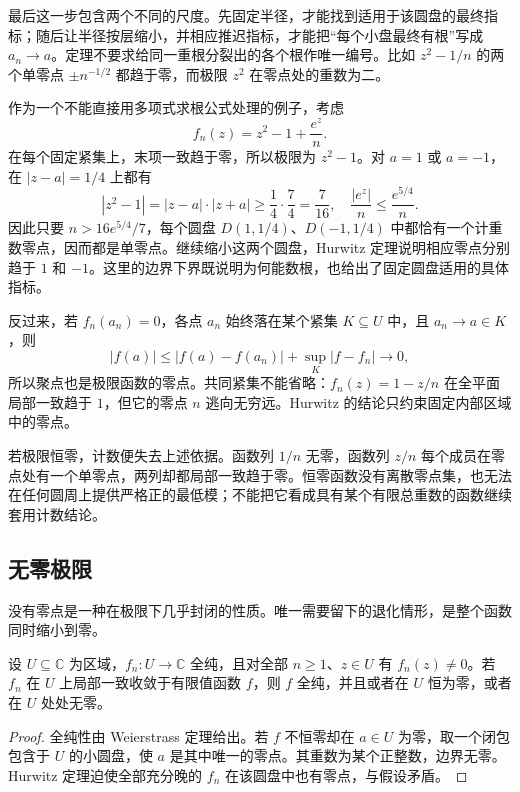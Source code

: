 最后这一步包含两个不同的尺度。先固定半径，才能找到适用于该圆盘的最终指标；随后让半径按层缩小，并相应推迟指标，才能把“每个小盘最终有根”写成 \(a_n\rightarrow a\)。定理不要求给同一重根分裂出的各个根作唯一编号。比如 \(z^2-1/n\) 的两个单零点 \(\pm n^{-1/2}\) 都趋于零，而极限 \(z^2\) 在零点处的重数为二。

\ProseParagraphBreak

作为一个不能直接用多项式求根公式处理的例子，考虑
\[
 f_n(z)=z^2-1+\frac{e^z}{n}.
\]
在每个固定紧集上，末项一致趋于零，所以极限为 \(z^2-1\)。对 \(a=1\) 或 \(a=-1\)，在 \(|z-a|=1/4\) 上都有
\[
 |z^2-1|=|z-a|\cdot|z+a|\ge\frac14\cdot\frac74=\frac7{16},
 \quad \frac{|e^z|}{n}\le\frac{e^{5/4}}n.
\]
因此只要 \(n>16e^{5/4}/7\)，每个圆盘 \(D(1,1/4)\)、\(D(-1,1/4)\) 中都恰有一个计重数零点，因而都是单零点。继续缩小这两个圆盘，Hurwitz 定理说明相应零点分别趋于 \(1\) 和 \(-1\)。这里的边界下界既说明为何能数根，也给出了固定圆盘适用的具体指标。

\ProseParagraphBreak

反过来，若 \(f_n(a_n)=0\)，各点 \(a_n\) 始终落在某个紧集 \(K\subseteq U\) 中，且 \(a_n\rightarrow a\in K\)，则
\[
 |f(a)|\le |f(a)-f(a_n)|+\sup_K|f-f_n|\longrightarrow0,
\]
所以聚点也是极限函数的零点。共同紧集不能省略：\(f_n(z)=1-z/n\) 在全平面局部一致趋于 \(1\)，但它的零点 \(n\) 逃向无穷远。Hurwitz 的结论只约束固定内部区域中的零点。

\ProseParagraphBreak

若极限恒零，计数便失去上述依据。函数列 \(1/n\) 无零，函数列 \(z/n\) 每个成员在零点处有一个单零点，两列却都局部一致趋于零。恒零函数没有离散零点集，也无法在任何圆周上提供严格正的最低模；不能把它看成具有某个有限总重数的函数继续套用计数结论。

\subsection{无零极限}
\label{b3:subsec:040402}

没有零点是一种在极限下几乎封闭的性质。唯一需要留下的退化情形，是整个函数同时缩小到零。

\begin{corollary}[无零极限]\label{b3:cor:04-zero-free-limit}
设 \(U\subseteq\mathbb C\) 为区域，\(f_n:U\rightarrow\mathbb C\) 全纯，且对全部 \(n\ge1\)、\(z\in U\) 有 \(f_n(z)\ne0\)。若 \(f_n\) 在 \(U\) 上局部一致收敛于有限值函数 \(f\)，则 \(f\) 全纯，并且或者在 \(U\) 恒为零，或者在 \(U\) 处处无零。
\end{corollary}
\begin{proof}
全纯性由 Weierstrass 定理给出。若 \(f\) 不恒零却在 \(a\in U\) 为零，取一个闭包包含于 \(U\) 的小圆盘，使 \(a\) 是其中唯一的零点。其重数为某个正整数，边界无零。Hurwitz 定理迫使全部充分晚的 \(f_n\) 在该圆盘中也有零点，与假设矛盾。
\end{proof}

